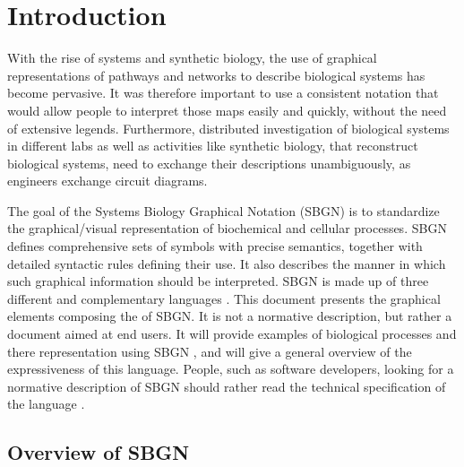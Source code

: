 

\chapter{Introduction}

With the rise of systems and synthetic biology, the use of graphical representations of pathways and networks to describe biological systems has become pervasive. It was therefore important to use a consistent notation that would allow people to interpret those maps easily and quickly, without the need of extensive legends. Furthermore, distributed investigation of biological systems in different labs as well as activities like synthetic biology, that reconstruct biological systems, need to exchange their descriptions unambiguously, as engineers exchange circuit diagrams.

The goal of the Systems Biology Graphical Notation (SBGN) is to standardize the graphical/visual representation of biochemical and cellular processes. SBGN defines comprehensive sets of symbols with precise semantics, together with detailed syntactic rules defining their use. It also describes the manner in which such graphical information should be interpreted. SBGN is made up of three different and complementary languages \cite{LeNovere:2009p1}. This document presents the graphical elements composing the \emph{\PDl{}} of SBGN. It is not a normative description, but rather a document aimed at end users. It will provide examples of biological processes and there representation using SBGN \PDl, and will give a general overview of the expressiveness of this language. People, such as software developers, looking for a normative description of SBGN \PDs should rather read the technical specification of the language \cite{Moodie:2011}.

\section{Overview of SBGN \PDs}
\label{sec:PD-overview}

